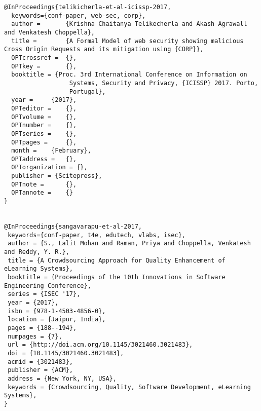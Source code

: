 \documentclass[11pt]{article}
\begin{document}
\begin{lstlisting}
@InProceedings{telikicherla-et-al-icissp-2017,
  keywords={conf-paper, web-sec, corp},
  author = 		 {Krishna Chaitanya Telikecherla and Akash Agrawall and Venkatesh Choppella},
  title = 		 {A Formal Model of web security showing malicious Cross Origin Requests and its mitigation using {CORP}},
  OPTcrossref =  {},
  OPTkey = 		 {},
  booktitle = {Proc. 3rd International Conference on Information on
                  Systems, Security and Privacy, {ICISSP} 2017. Porto,
                  Portugal},
  year = 	 {2017},
  OPTeditor = 	 {},
  OPTvolume = 	 {},
  OPTnumber = 	 {},
  OPTseries = 	 {},
  OPTpages = 	 {},
  month = 	 {February},
  OPTaddress = 	 {},
  OPTorganization = {},
  publisher = {Scitepress},
  OPTnote = 	 {},
  OPTannote = 	 {}
}


@InProceedings{sangavarapu-et-al-2017,
 keywords={conf-paper, t4e, edutech, vlabs, isec},
 author = {S., Lalit Mohan and Raman, Priya and Choppella, Venkatesh and Reddy, Y. R.},
 title = {A Crowdsourcing Approach for Quality Enhancement of eLearning Systems},
 booktitle = {Proceedings of the 10th Innovations in Software Engineering Conference},
 series = {ISEC '17},
 year = {2017},
 isbn = {978-1-4503-4856-0},
 location = {Jaipur, India},
 pages = {188--194},
 numpages = {7},
 url = {http://doi.acm.org/10.1145/3021460.3021483},
 doi = {10.1145/3021460.3021483},
 acmid = {3021483},
 publisher = {ACM},
 address = {New York, NY, USA},
 keywords = {Crowdsourcing, Quality, Software Development, eLearning Systems},
}

\end{lstlisting}
\end{document}
